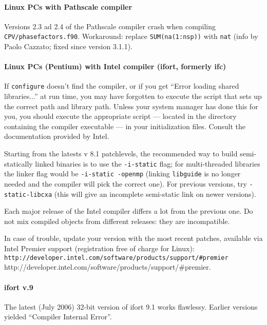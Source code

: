 \documentclass[12pt,a4paper]{article}
\begin{document}
\paragraph{Linux PCs with Pathscale compiler}

Versions 2.3 ad 2.4 of the Pathscale compiler crash when compiling
\texttt{CPV/phasefactors.f90}. Workaround: replace \texttt{SUM(na(1:nsp))}
with \texttt{nat} (info by Paolo Cazzato; fixed since version 3.1.1).

\paragraph{Linux PCs (Pentium) with Intel compiler (ifort, formerly
ifc)}

\hfill\break
If \texttt{configure} doesn't find the compiler, or if you get ``Error
loading shared libraries...'' at run time, you may have forgotten to
execute the script that sets up the correct path and library path.
Unless your system manager has done this for you, you should execute
the appropriate script --- located in the directory containing the
compiler executable --- in your initialization files.
Consult the documentation provided by Intel. 

Starting from the latests v 8.1 patchlevels, the recommended way to
build semi-statically linked binaries is to use the \texttt{-i-static}
flag; for multi-threaded libraries the linker flag would be
\texttt{-i-static -openmp} (linking \texttt{libguide} is no longer 
needed and the compiler will pick the correct one). For previous 
versions, try \texttt{-static-libcxa} (this will
give an incomplete semi-static link on newer versions).

Each major release of the Intel compiler differs a lot from
the previous one. Do not mix compiled objects from different releases: 
they are incompatible. 

In case of trouble, update your version with the most recent
patches, available via Intel Premier support (registration free 
of charge for Linux): 
\htmladdnormallink%
{\texttt{http://developer.intel.com/software/products/support/\#premier}}%
{http://developer.intel.com/software/products/support/\#premier}.

\paragraph{ifort v.9}

The latest (July 2006) 32-bit version of ifort 9.1 works flawlessy.
Earlier versions yielded ``Compiler Internal Error''.
\end{document}
